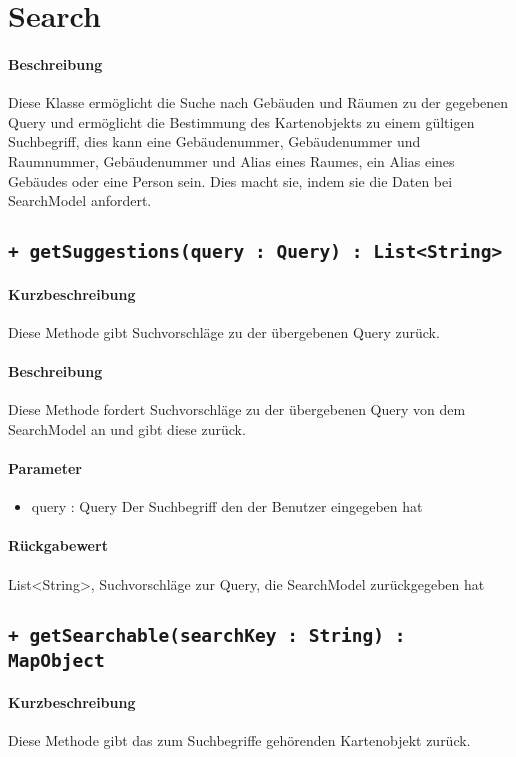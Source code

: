 \section{Search}
\paragraph*{Beschreibung}
Diese Klasse ermöglicht die Suche nach Gebäuden und Räumen zu der gegebenen Query 
und ermöglicht die Bestimmung des Kartenobjekts zu einem gültigen Suchbegriff, 
dies kann eine Gebäudenummer, Gebäudenummer und Raumnummer, Gebäudenummer und Alias eines Raumes, ein Alias eines Gebäudes oder eine Person sein.
Dies macht sie, indem sie die Daten bei SearchModel anfordert.

\subsection{\texttt{+ getSuggestions(query : Query) : List<String>}}%
\paragraph*{Kurzbeschreibung}
Diese Methode gibt Suchvorschläge zu der übergebenen Query zurück.
\paragraph*{Beschreibung}
Diese Methode fordert Suchvorschläge zu der übergebenen Query von dem SearchModel an und gibt diese zurück.
\paragraph*{Parameter}
\begin{itemize}
    \item query : Query Der Suchbegriff den der Benutzer eingegeben hat
\end{itemize}
\paragraph*{Rückgabewert}
List<String>, Suchvorschläge zur Query, die SearchModel zurückgegeben hat

\subsection{\texttt{+ getSearchable(searchKey : String) : MapObject}}%
\paragraph*{Kurzbeschreibung}
Diese Methode gibt das zum Suchbegriffe gehörenden Kartenobjekt zurück.
